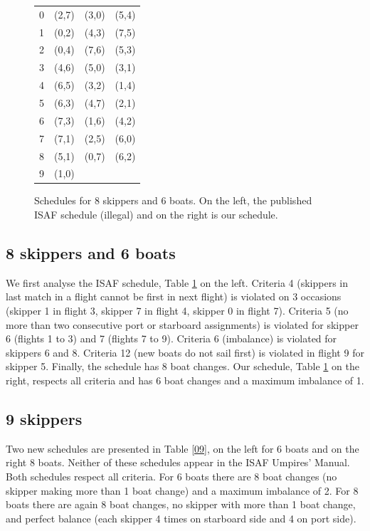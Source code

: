 \documentclass{llncs}
\begin{document}
\begin{center}
\begin{figure}[h]
\begin{minipage}[t]{0.5\textwidth}
\begin{tabular}{cccc}
        0 & (2,7) & (3,0) & (5,4) \\ 
        1 & (0,2)  & (4,3) & (7,5) \\
        2 & (0,4) & (7,6) & (5,3) \\
        3 & (4,6) & (5,0) & (3,1) \\
        4 & (6,5) & (3,2) & (1,4) \\
        5 & (6,3) & (4,7) & (2,1) \\
        6 & (7,3) & (1,6) & (4,2) \\
       7 & (7,1)  & (2,5) & (6,0) \\
       8 & (5,1)  & (0,7) & (6,2) \\
       9 & (1,0)  & & \\ \bottomrule
    \end{tabular}
\label{08-06b}
\end{minipage}
\caption{Schedules for 8 skippers and 6 boats. On the left, the published ISAF schedule (illegal) and on the right is our schedule.}
\label{08-06}
\end{figure}
\end{center}

\noindent
\subsection{8 skippers and 6 boats}
We first analyse the ISAF schedule, Table \ref{08-06} on the left. Criteria 4 (skippers in last match in a flight cannot be first in next flight) is violated on 3 occasions (skipper 1 in flight 3, skipper 7 in flight 4, skipper 0 in flight 7). Criteria 5 (no more than two consecutive port or starboard assignments) is violated for skipper 6 (flights 1 to 3) and 7 (flights 7 to 9). Criteria 6 (imbalance) is violated for skippers 6 and 8. Criteria 12  (new boats do not sail first) is violated in flight 9 for skipper 5. Finally, the schedule has 8 boat changes. Our schedule, Table \ref{08-06} on the right, respects all criteria and has 6 boat changes and a maximum imbalance of 1.

\subsection{9 skippers}
Two new schedules are presented in Table \ref{09}, on the left for 6 boats and on the right 8 boats. Neither of these schedules appear in the ISAF Umpires' Manual. Both schedules respect all criteria. For 6 boats there are 8 boat changes (no skipper making more than 1 boat change) and a maximum imbalance of 2. For 8 boats there are again 8 boat changes, no skipper with more than 1 boat change, and perfect balance (each skipper 4 times on starboard side and 4 on port side).
\end{document}
